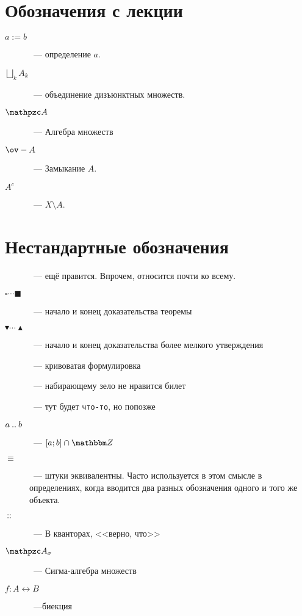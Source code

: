 \documentclass[12pt,timbord]{longnotes}
\begin{document}
\section*{Обозначения с лекции}
\begin{description}
  \item[$a:= b$]~--- определение $a$.
  \item[$\displaystyle \bigsqcup_k A_k$]~--- объединение дизъюнктных множеств.
  \item[$\alg$]~--- Алгебра множеств
  \item[$\ov-{A}$]~--- Замыкание $A$.
  \item[$A^c$]~--- $X \setminus  A$.
\end{description}

\section*{Нестандартные обозначения}

\begin{description}
  \item[\underdev]~--- ещё правится. Впрочем, относится почти ко всему.
  \item[$\square\cdots\blacksquare$]~--- начало и конец доказательства теоремы
  \item[$\blacktriangledown\cdots\blacktriangle$]~--- начало и конец доказательства более мелкого 
    утверждения
  \item[\sour]~--- кривоватая формулировка
  \item[\flame]~--- набирающему зело не нравится билет
  \item[]~--- тут будет \texttt{что-то}, но попозже
  \item[$a\mathbin{..} b$]~--- $[a;b]\cap \Z$
  \item[$\equiv$]~--- штуки эквивалентны. Часто используется в этом смысле в
    определениях, когда вводится два разных обозначения одного и того же
    объекта.
  \item[$\:::\:$]~--- В кванторах, <<верно, что>>
  \item[$\alg_\sigma$]~--- Сигма-алгебра множеств
  \item[$f \colon A \leftrightarrow B$]~---биекция
\end{description}
\end{document}
